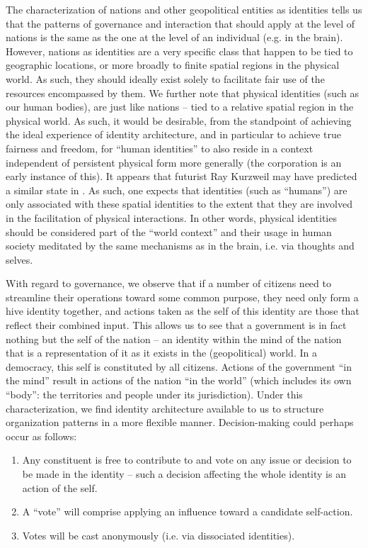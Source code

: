 \documentclass[pra,twocolumn,groupedaddress,10pt]{revtex4}
\theoremstyle{definition}
\begin{document}
The characterization of nations and other geopolitical entities as identities tells us that the patterns of governance and interaction that should apply at the level of nations is the same as the one at the level of an individual (e.g. in the brain). However, nations as identities are a very specific class that happen to be tied to geographic locations, or more broadly to finite spatial regions in the physical world. As such, they should ideally exist solely to facilitate fair use of the resources encompassed by them. We further note that physical identities (such as our human bodies), are just like nations -- tied to a relative spatial region in the physical world. As such, it would be desirable, from the standpoint of achieving the ideal experience of identity architecture, and in particular to achieve true fairness and freedom, for ``human identities'' to also reside in a context independent of persistent physical form more generally (the corporation is an early instance of this). It appears that futurist Ray Kurzweil may have predicted a similar state in \cite{kurzweil}. As such, one expects that identities (such as ``humans'') are only associated with these spatial identities to the extent that they are involved in the facilitation of physical interactions. In other words, physical identities should be considered part of the ``world context'' and their usage in human society meditated by the same mechanisms as in the brain, i.e. via thoughts and selves.

With regard to governance, we observe that if a number of citizens need to streamline their operations toward some common purpose, they need only form a hive identity together, and actions taken as the self of this identity are those that reflect their combined input. This allows us to see that a government is in fact nothing but the self of the nation -- an identity within the mind of the nation that is a representation of it as it exists in the (geopolitical) world. In a democracy, this self is constituted by all citizens. Actions of the government ``in the mind'' result in actions of the nation ``in the world'' (which includes its own ``body'': the territories and people under its jurisdiction). Under this characterization, we find identity architecture available to us to structure organization patterns in a more flexible manner. Decision-making could perhaps occur as follows:

\begin{enumerate}
	\item Any constituent is free to contribute to and vote on any issue or decision to be made in the identity -- such a decision affecting the whole identity is an action of the self.
	\item A ``vote'' will comprise applying an influence toward a candidate self-action.
	\item Votes will be cast anonymously (i.e. via dissociated identities).
\end{enumerate}
\end{document}
